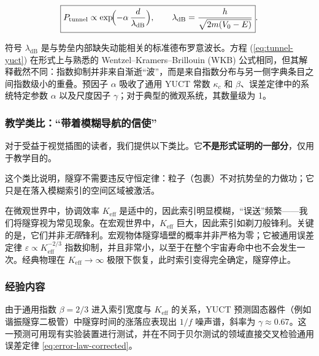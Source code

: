 \documentclass[12pt,a4paper]{article}
\theoremstyle{remark}
\begin{document}
	\begin{equation}
		\boxed{ P_{\mathrm{tunnel}} \propto \exp\!\Bigl( -\alpha \,
			\frac{d}{\lambda_{\mathrm{dB}}} \Bigr),
			\qquad
			\lambda_{\mathrm{dB}} = \frac{h}{\sqrt{2m(V_0-E)}} }.
		\label{eq:tunnel-yuct}
	\end{equation}
	
	符号 $\lambda_{\mathrm{dB}}$ 是与势垒内部缺失动能相关的标准德布罗意波长。方程 (\ref{eq:tunnel-yuct}) 在形式上与熟悉的 Wentzel–Kramers–Brillouin (WKB) 公式相同，但其解释截然不同：指数抑制并非来自渐逝“波”，而是来自指数分布与另一侧字典条目之间指数级小的重叠。预因子 $\alpha$ 吸收了通用 YUCT 常数 $\kappa_c$ 和 $\beta$、误差定律中的系统特定参数 $\alpha$ 以及尺度因子 $\gamma$；对于典型的微观系统，其数量级为 1。
	
	\subsubsection{教学类比：“带着模糊导航的信使”}
	
	对于受益于视觉插图的读者，我们提供以下类比。它\textbf{不是形式证明的一部分}，仅用于教学目的。
	
	\medskip
	\medskip
	
	这个类比说明，隧穿不需要违反守恒定律：粒子（包裹）不对抗势垒的力做功；它只是在落入模糊索引的空间区域被激活。
	
	在微观世界中，协调效率 \(K_{\mathrm{eff}}\) 是适中的，因此索引明显模糊，“误送”频繁——我们将隧穿视为常见现象。在宏观世界中，\(K_{\mathrm{eff}}\) 巨大，因此索引如剃刀般锋利。关键的是，它们并非\emph{无限}锋利。宏观物体隧穿墙壁的概率并非严格为零；它被通用误差定律 \(\varepsilon \propto K_{\mathrm{eff}}^{-2/3}\) 指数抑制，并且非常小，以至于在整个宇宙寿命中也不会发生一次。经典物理在 \(K_{\mathrm{eff}} \to \infty\) 极限下恢复，此时索引变得完全确定，隧穿停止。
	
	\subsubsection{经验内容}
	
	由于通用指数 $\beta=2/3$ 进入索引宽度与 $K_{\mathrm{eff}}$ 的关系，YUCT 预测固态器件（例如谐振隧穿二极管）中隧穿时间的涨落应表现出 $1/f$ 噪声谱，斜率为 $\gamma \approx 0.67$。这一预测可用现有实验装置进行测试，并在不同于贝尔测试的领域直接交叉检验通用误差定律 \eqref{eq:error-law-corrected}。
	
\end{document}
